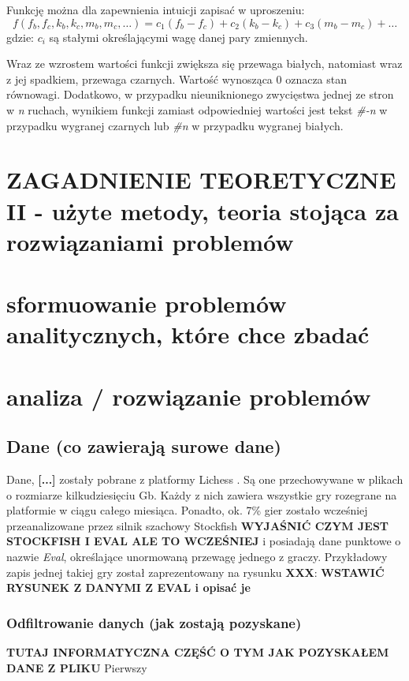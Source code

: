 \documentclass[inzynierska]{pwr_wmat_praca_dyplomowa}
\theoremstyle{plain}
\numberwithin{theorem}{chapter}
\theoremstyle{definition}
\numberwithin{theorem}{chapter}
\begin{document}
Funkcję można dla zapewnienia intuicji zapisać w uproszeniu:
\begin{equation}
	f(f_b,f_c,k_b,k_c,m_b,m_c,\dots)=c_1(f_b-f_c)+c_2(k_b-k_c)+c_3(m_b-m_c)+\dots
\end{equation}
gdzie:
$c_i$ są stałymi określającymi wagę danej pary zmiennych.

Wraz ze wzrostem wartości funkcji zwiększa się przewaga białych, natomiast wraz z jej spadkiem, przewaga czarnych. Wartość wynosząca 0 oznacza stan równowagi. Dodatkowo, w przypadku nieuniknionego zwycięstwa jednej ze stron w \textit{n} ruchach, wynikiem funkcji zamiast odpowiedniej wartości jest tekst \textit{\#-n} w przypadku wygranej czarnych lub \textit{\#n} w przypadku wygranej białych.



\chapter{ZAGADNIENIE TEORETYCZNE II - użyte metody, teoria stojąca za rozwiązaniami problemów}
\chapter{sformuowanie problemów analitycznych, które chce zbadać}
\chapter{analiza / rozwiązanie problemów}
\section{Dane (co zawierają surowe dane)}
Dane, \textbf{[...]} zostały pobrane z platformy Lichess \cite{lichess}. Są one przechowywane w plikach o rozmiarze kilkudziesięciu Gb. Każdy z nich zawiera wszystkie gry rozegrane na platformie w ciągu całego miesiąca. Ponadto, ok. 7\% gier zostało wcześniej przeanalizowane przez silnik szachowy Stockfish \textbf{WYJAŚNIĆ CZYM JEST STOCKFISH I EVAL ALE TO WCZEŚNIEJ} i posiadają dane punktowe o nazwie \textit{Eval}, określające unormowaną przewagę jednego z graczy. Przykładowy zapis jednej takiej gry został zaprezentowany na rysunku \textbf{XXX}:
\textbf{WSTAWIĆ RYSUNEK Z DANYMI Z EVAL i opisać je}
\subsection{Odfiltrowanie danych (jak zostają pozyskane)}
\textbf{TUTAJ INFORMATYCZNA CZĘŚĆ O TYM JAK POZYSKAŁEM DANE Z PLIKU}
Pierwszy
\end{document}
